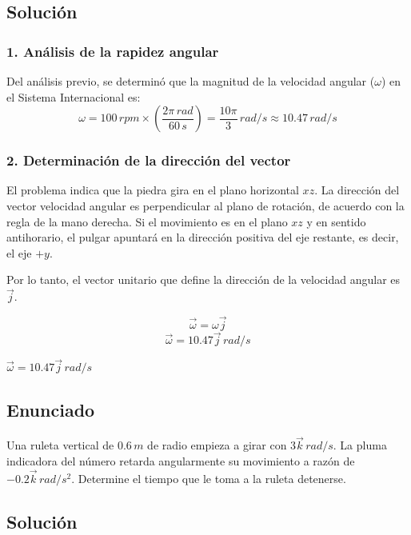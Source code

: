 \documentclass[12pt, a4paper]{article}
\begin{document}
\subsection*{Solución}

\subsubsection*{1. Análisis de la rapidez angular}
Del análisis previo, se determinó que la magnitud de la velocidad angular ($\omega$) en el Sistema Internacional es:
$$ \omega = 100 \, \si{rpm} \times \left( \frac{2\pi \, \si{rad}}{60 \, \si{s}} \right) = \frac{10\pi}{3} \, \si{rad/s} \approx 10.47 \, \si{rad/s} $$

\subsubsection*{2. Determinación de la dirección del vector}
El problema indica que la piedra gira en el plano horizontal $xz$.
La dirección del vector velocidad angular es perpendicular al plano de rotación, de acuerdo con la regla de la mano derecha.
Si el movimiento es en el plano $xz$ y en sentido antihorario, el pulgar apuntará en la dirección positiva del eje restante, es decir, el eje $+y$.

Por lo tanto, el vector unitario que define la dirección de la velocidad angular es $\vec{j}$.

$$ \vec{\omega} = \omega \vec{j} $$
$$ \vec{\omega} = 10.47\vec{j} \, \si{rad/s} $$

\begin{tcolorbox}[colback=green!5!white, colframe=green!50!black, title=Respuesta Final]
\centering \Large $\vec{\omega} = 10.47\vec{j} \, \si{rad/s}$
\end{tcolorbox}

\newpage

\subsection*{Enunciado}
Una ruleta vertical de $0.6 \, \si{m}$ de radio empieza a girar con $3\vec{k} \, \si{rad/s}$. La pluma indicadora del número retarda angularmente su movimiento a razón de $-0.2\vec{k} \, \si{rad/s^2}$. Determine el tiempo que le toma a la ruleta detenerse.

\subsection*{Solución}
\end{document}
